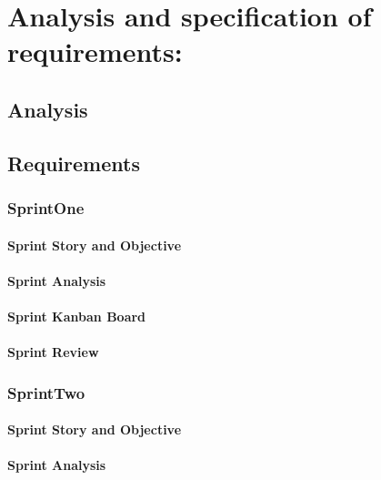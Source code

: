 \chapter{Analysis and specification of requirements:}
\setcounter{secnumdepth}{3}
\newpage

\section{Analysis}

\section{Requirements}

\subsection{SprintOne}

\subsubsection{Sprint Story and Objective}

\subsubsection{Sprint Analysis}

\subsubsection{Sprint Kanban Board}

\subsubsection{Sprint Review}

\subsection{SprintTwo}

\subsubsection{Sprint Story and Objective}

\subsubsection{Sprint Analysis}

